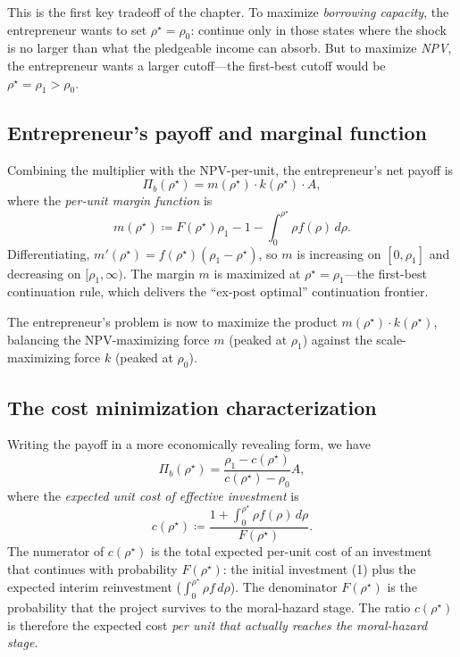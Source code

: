\documentclass[11pt,a4paper,oneside]{book}
\theoremstyle{plain}
\theoremstyle{definition}
\theoremstyle{remark}
\numberwithin{equation}{chapter}
\begin{document}
This is the first key tradeoff of the chapter.
To maximize \emph{borrowing capacity}, the entrepreneur wants to set $\rho^\star = \rho_0$: continue only in those states where the shock is no larger than what the pledgeable income can absorb.
But to maximize \emph{NPV}, the entrepreneur wants a larger cutoff---the first-best cutoff would be $\rho^\star = \rho_1 > \rho_0$.

\subsection{Entrepreneur's payoff and marginal function}

Combining the multiplier with the NPV-per-unit, the entrepreneur's net payoff is
\begin{equation}\label{eq:LS-Pi-final}
  \Pi_b(\rho^\star) = m(\rho^\star) \cdot k(\rho^\star) \cdot A,
\end{equation}
where the \emph{per-unit margin function} is
\begin{equation}\label{eq:LS-m}
  m(\rho^\star) \coloneqq F(\rho^\star) \rho_1 - 1 - \int_0^{\rho^\star} \rho f(\rho) \, d\rho.
\end{equation}
Differentiating, $m'(\rho^\star) = f(\rho^\star)(\rho_1 - \rho^\star)$, so $m$ is increasing on $[0, \rho_1]$ and decreasing on $[\rho_1, \infty)$.
The margin $m$ is maximized at $\rho^\star = \rho_1$---the first-best continuation rule, which delivers the ``ex-post optimal'' continuation frontier.

The entrepreneur's problem is now to maximize the product $m(\rho^\star) \cdot k(\rho^\star)$, balancing the NPV-maximizing force $m$ (peaked at $\rho_1$) against the scale-maximizing force $k$ (peaked at $\rho_0$).

\subsection{The cost minimization characterization}

Writing the payoff in a more economically revealing form, we have
\begin{equation}\label{eq:LS-payoff-ratio}
  \Pi_b(\rho^\star) = \frac{\rho_1 - c(\rho^\star)}{c(\rho^\star) - \rho_0} A,
\end{equation}
where the \emph{expected unit cost of effective investment} is
\begin{equation}\label{eq:LS-c}
  c(\rho^\star) \coloneqq \frac{1 + \int_0^{\rho^\star} \rho f(\rho) \, d\rho}{F(\rho^\star)}.
\end{equation}
The numerator of $c(\rho^\star)$ is the total expected per-unit cost of an investment that continues with probability $F(\rho^\star)$: the initial investment (1) plus the expected interim reinvestment ($\int_0^{\rho^\star} \rho f \, d\rho$).
The denominator $F(\rho^\star)$ is the probability that the project survives to the moral-hazard stage.
The ratio $c(\rho^\star)$ is therefore the expected cost \emph{per unit that actually reaches the moral-hazard stage}.
\end{document}
